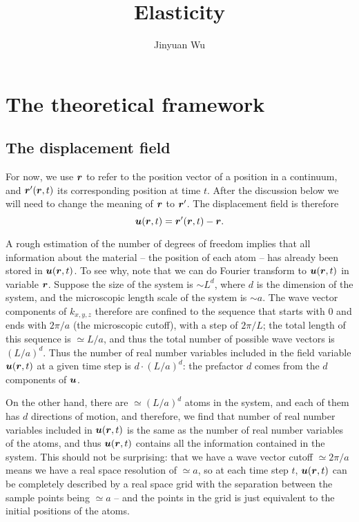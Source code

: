 \documentclass[hyperref, a4paper]{article}
\title{Elasticity}
\author{Jinyuan Wu}
\begin{document}
\maketitle

\section{The theoretical framework}

\subsection{The displacement field}

For now, we use $\vb*{r}$ to refer to the position vector of a position in a continuum,
and $\vb*{r}'(\vb*{r}, t)$ its corresponding position at time $t$.
After the discussion below we will need to change the meaning of $\vb*{r}$ to $\vb*{r}'$.
The displacement field is therefore 
\begin{equation}
    \vb*{u}(\vb*{r}, t) = \vb*{r}'(\vb*{r}, t) - \vb*{r}.
\end{equation}

A rough estimation of the number of degrees of freedom 
implies that all information about the material -- the position of each atom -- 
has already been stored in $\vb*{u}(\vb*{r}, t)$.
To see why, note that we can do Fourier transform to $\vb*{u}(\vb*{r}, t)$ 
in variable $\vb*{r}$.
Suppose the size of the system is $\sim L^d$,
where $d$ is the dimension of the system,
and the microscopic length scale of the system is $\sim a$.
The wave vector components of $k_{x, y, z}$ therefore are
confined to the sequence that starts with $0$ and ends with $2\pi / a$ 
(the microscopic cutoff),
with a step of $2\pi / L$;
the total length of this sequence is $\simeq L / a$,
and thus the total number of possible wave vectors is $(L / a)^d$.
Thus the number of real number variables included in the field variable $\vb*{u}(\vb*{r}, t)$ 
at a given time step 
is $d \cdot (L / a)^d$:
the prefactor $d$ comes from the $d$ components of $\vb*{u}$.

On the other hand, there are $\simeq (L / a)^d$ atoms in the system,
and each of them has $d$ directions of motion,
and therefore, we find that number of real number variables included in $\vb*{u}(\vb*{r}, t)$
is the same as the number of real number variables of the atoms,
and thus $\vb*{u}(\vb*{r}, t)$ contains all the information contained in the system.
This should not be surprising:
that we have a wave vector cutoff $\simeq 2\pi /a$ 
means we have a real space resolution of $\simeq a$,
so at each time step $t$, $\vb*{u}(\vb*{r}, t)$ 
can be completely described by a real space grid with 
the separation between the sample points being $\simeq a$ -- 
and the points in the grid is just equivalent to the initial positions of the atoms.
\end{document}
